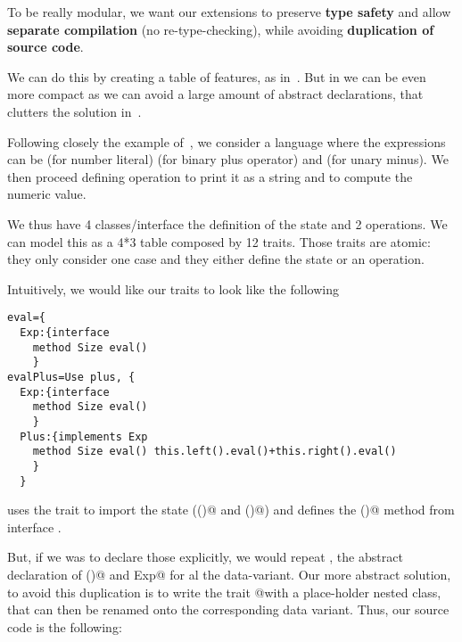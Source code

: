 To be really modular, we want our extensions to
preserve \textbf{type safety}
and allow \textbf{separate compilation} (no re-type-checking),
while avoiding \textbf{duplication of source code}.

We can do this by creating a table of features, as in~\cite{Deepfjig}.
But in \name we can be even more compact as we can avoid a large amount of abstract declarations,
that clutters the solution in~\cite{Deepfjig}.

Following closely
the example of~\cite{},
we consider a language where the
expressions \Q@Exp@ can
be \Q@Num@ (for number literal)
\Q@Plus@ (for binary plus operator)
and \Q@Neg@ (for unary minus).
We then proceed defining operation
\Q@show@ to print it as a string
and \Q@eval@ to compute the numeric value.

We thus have 4 classes/interface
the definition of the state and 2 operations.
We can model this as a 4*3 table composed by 12 traits.
Those traits are atomic: they only consider one case and
they either define the state or an operation.

Intuitively, we would like our traits to look like the following 
\begin{lstlisting}
eval={
  Exp:{interface
    method Size eval()
    }
evalPlus=Use plus, {
  Exp:{interface
    method Size eval()
    }
  Plus:{implements Exp
    method Size eval() this.left().eval()+this.right().eval() 
    }
  }
\end{lstlisting}
\Q@basePlus@ uses the trait \Q@plus@ to import the state (\Q@left()@ and \Q@right()@)
and defines the \Q@eval()@ method from interface \Q@Exp@.

But, if we was to declare those
explicitly, we would repeat \Q@Exp@, the abstract
declaration of \Q@eval()@ and \Q@implements Exp@
for al the data-variant.
Our more abstract solution, to avoid this duplication is to write 
the trait \Q@eval @with a place-holder \Q@T@ nested class, that can then be renamed
onto the corresponding data variant.
Thus, our source code is the following:

